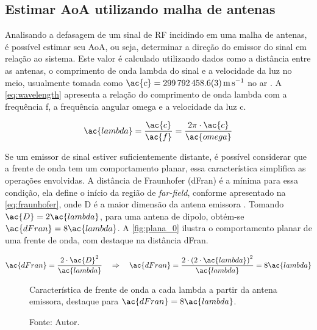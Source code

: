 \subsection{Estimar \acs{AoA} utilizando malha de antenas}\label{ssec:aoa}

Analisando a defasagem de um sinal de \ac{RF} incidindo em uma malha de antenas, é possível estimar seu \acf{AoA}, ou seja, determinar a direção do emissor do sinal em relação ao sistema.
Este valor é calculado utilizando dados como a distância entre as antenas, o comprimento de onda \ac{lambda} do sinal e a velocidade da luz no meio, usualmente tomada como $\ac{c} = \SI{299792458,6 \pm 0,3}{\metre\per\second}$ no ar \cite{jennings1987continuity, bensky2016wireless, horst2021localization, Schssel2016AngleOA}.
A \autoref{eq:wavelength} apresenta a relação do comprimento de onda \ac{lambda} com a frequência \ac{f}, a frequência angular \ac{omega} e a velocidade da luz \ac{c}.

\begin{equation} \label{eq:wavelength}
    \ac{lambda} = \frac{\ac{c}}{\ac{f}} = \frac{2\pi \cdot \ac{c}}{\ac{omega}}
\end{equation}


Se um emissor de sinal estiver suficientemente distante, é possível considerar que a frente de onda tem um comportamento planar, essa característica simplifica as operações envolvidas.
A distância de Fraunhofer (\ac{dFran}) é a mínima para essa condição, ela define o início da região de \textit{far-field}, conforme apresentado na \autoref{eq:fraunhofer}, onde \ac{D} é a maior dimensão da antena emissora \cite{balanis2016antenna}.
Tomando $ \ac{D} = 2 \ac{lambda}$, para uma antena de dipolo, obtém-se $\ac{dFran} = 8 \ac{lambda} $.
A \autoref{fig:plana_0} ilustra o comportamento planar de uma frente de onda, com destaque na distância \ac{dFran}.

\begin{equation} \label{eq:fraunhofer}
    \ac{dFran} = \frac{2 \cdot \ac{D}^2}{\ac{lambda}} \quad \Rightarrow \quad \ac{dFran} = \frac{2 \cdot \left(2 \cdot \ac{lambda} \right)^2}{\ac{lambda}} = 8 \ac{lambda}
\end{equation}

\begin{figure}[htbp]
    \centering
    \caption{Característica de frente de onda a cada \ac{lambda} a partir da antena emissora, destaque para $\ac{dFran} = 8 \ac{lambda}$.}
    
    \caption*{Fonte: Autor.}
    \label{fig:plana_0}
\end{figure}

